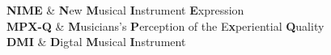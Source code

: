 \documentclass[a4paper, 11pt, oneside]{Thesis}  %
\begin{document}
\clearpage  %
{
\textbf{NIME} & \textbf{N}ew \textbf{M}usical \textbf{I}nstrument \textbf{E}xpression \\

\textbf{MPX-Q} & \textbf{M}usicians's \textbf{P}erception of the E\textbf{x}periential \textbf{Q}uality\\

\textbf{DMI} & \textbf{D}igtal \textbf{M}usical \textbf{I}nstrument \\
}

%

%
%
%
%
%
\mainmatter	  %
\pagestyle{fancy}  %
\end{document}
